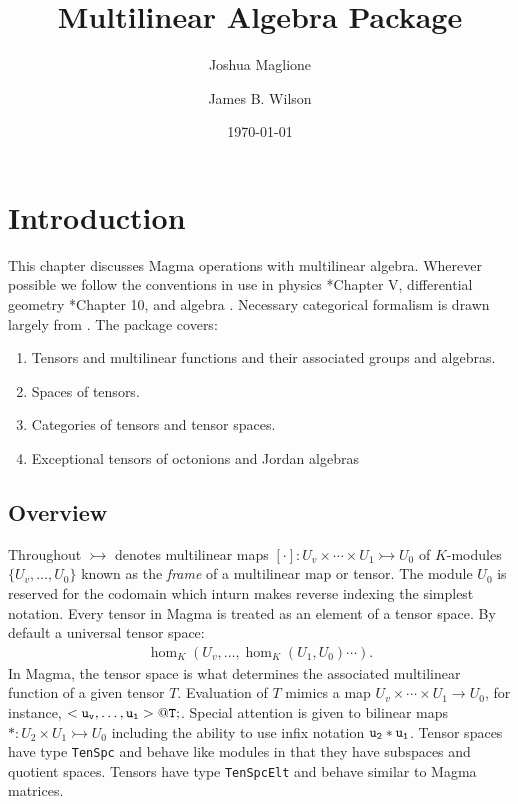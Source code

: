 \documentclass{documentation}
\title{Multilinear Algebra Package}
\author{Joshua Maglione}
\author{James B. Wilson}
\date{\today}
\begin{document}
\frontmatter

\dominitoc
\maketitle
\tableofcontents

\mainmatter

\chapter{Introduction}

This chapter discusses Magma operations with multilinear algebra.
Wherever possible we follow the conventions in use in physics 
\cite{Weyl}*{Chapter V}, differential geometry 
\cite{Lee:geom}*{Chapter 10}, and algebra \cite{Landsberg:tensors}.
Necessary categorical formalism is drawn largely from
\cite{Wilson:division}.  The package covers:
\begin{enumerate}
\item Tensors and multilinear functions and their associated groups and algebras.
\item Spaces of tensors.
\item Categories of tensors and tensor spaces.
\item Exceptional tensors of octonions and Jordan algebras
\end{enumerate}

\section{Overview}
Throughout $\rightarrowtail$ denotes multilinear maps 
$[\cdot]:U_v\times \cdots \times U_1\rightarrowtail U_0$ of
$K$-modules $\{U_v,\dots,U_0\}$ known as the {\em frame} of a 
multilinear map or tensor.  
The module $U_0$ is reserved for the codomain which inturn makes
reverse indexing the simplest notation.
Every tensor in Magma is treated as an element of a tensor space.
By default a universal tensor space:
\begin{align*}
	\hom_K(U_v,\dots,\hom_K(U_1,U_0)\cdots).
\end{align*} 
In Magma, the tensor space is what determines the associated
multilinear function of a given tensor $T$.  
Evaluation of $T$ mimics a map
$U_v\times \cdots \times U_1\to U_0$, for instance, ${\tt	< u_v,\dots,u_1> @ T;}$.
Special attention is given to bilinear maps 
$*:U_2\times U_1\rightarrowtail U_0$
including the ability to use infix notation ${\tt u_2*u_1}$.
Tensor spaces have type {\tt TenSpc} and behave like modules 
in that they have subspaces and quotient spaces.  Tensors have type 
{\tt TenSpcElt} and behave similar to Magma matrices.
\end{document}
